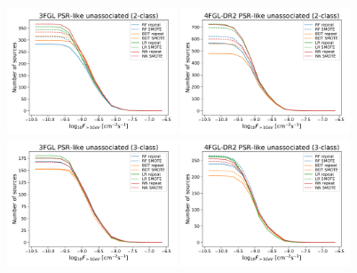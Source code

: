 \begin{figure}[h]
\centering
\hspace*{-0.5cm}
\includegraphics[width=0.45\textwidth]{plots/oversample/N_logS_3FGL_PSR_2classes_O_vs_S.pdf}
\hspace*{-0.5cm}
\includegraphics[width=0.45\textwidth]{plots/oversample/N_logS_4FGL-DR2_PSR_2classes_O_vs_S.pdf}\\
\hspace*{-0.5cm}
\includegraphics[width=0.45\textwidth]{plots/oversample/N_logS_3FGL_PSR_3classes_O_vs_S.pdf}
\hspace*{-0.5cm}
\includegraphics[width=0.45\textwidth]{plots/oversample/N_logS_4FGL-DR2_PSR_3classes_O_vs_S.pdf}\\

\end{figure}
